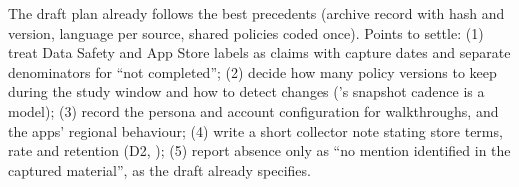 \begin{thesisbox}
The draft plan already follows the best precedents (archive record with hash and version, language per source, shared policies coded once). Points to settle: (1) treat Data Safety and App Store labels as claims with capture dates and separate denominators for ``not completed''; (2) decide how many policy versions to keep during the study window and how to detect changes ('s snapshot cadence is a model); (3) record the persona and account configuration for walkthroughs, and the apps' regional behaviour; (4) write a short collector note stating store terms, rate and retention (D2, ); (5) report absence only as ``no mention identified in the captured material'', as the draft already specifies.
\end{thesisbox}
